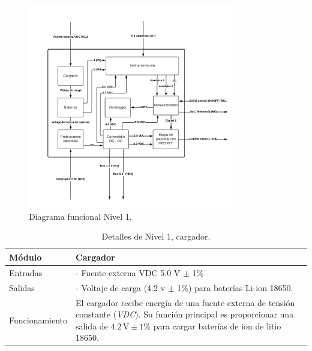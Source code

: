 \begin{figure}[h!]
\centering
\includegraphics[width=0.8\textwidth]{Pictures/Level1.png}
\caption{Diagrama funcional Nivel 1.}\label{fig:Level1}
\end{figure}

\begin{table}[h!]
    \centering
    \caption{Detalles de Nivel 1, cargador.}
    \label{tab:nivel1_cargador}
    \begin{tabular}{ll}
    \toprule
        Módulo  & Cargador\\ 
    \midrule
        Entradas & 
        \begin{minipage}[t]{0.75\linewidth}
 - Fuente externa VDC 5.0 V $\pm$ 1\% 
        \end{minipage} \\
    \midrule
        Salidas & 
        \begin{minipage}[t]{0.75\linewidth}
        - Voltaje de carga (4.2 v $\pm$ 1\%) para baterías Li-ion 18650.
        \end{minipage} \\
    \midrule
        Funcionamiento & 
        \begin{minipage}[t]{0.75\linewidth}
El cargador recibe energía de una fuente externa de tensión constante (\textit{VDC}). Su función principal es proporcionar una salida de $4.2 \, \text{V} \pm 1\%$ para cargar baterías de ion de litio 18650.

        \end{minipage} \\
    \bottomrule
    \end{tabular}
\end{table}
\newpage

